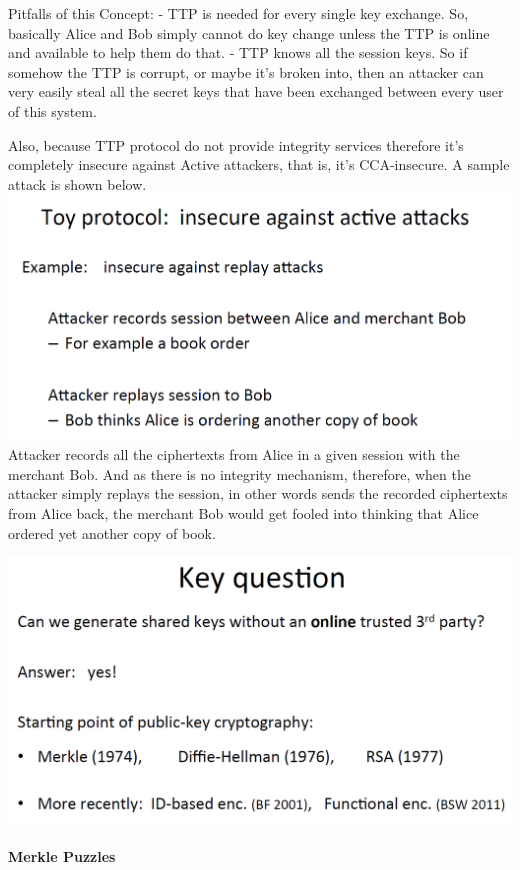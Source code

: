 \documentclass[11pt]{article}
\makeatletter
\def\maxwidth{\ifdim\Gin@nat@width>\linewidth\linewidth
    \else\Gin@nat@width\fi}
\let\Oldincludegraphics\includegraphics
\renewcommand{\includegraphics}[1]{\Oldincludegraphics[width=.8\maxwidth]{#1}}
\makeatother
\begin{document}
Pitfalls of this Concept: - TTP is needed for every single key exchange.
So, basically Alice and Bob simply cannot do key change unless the TTP
is online and available to help them do that. - TTP knows all the
session keys. So if somehow the TTP is corrupt, or maybe it's broken
into, then an attacker can very easily steal all the secret keys that
have been exchanged between every user of this system.

Also, because TTP protocol do not provide integrity services therefore
it's completely insecure against Active attackers, that is, it's
CCA-insecure. A sample attack is shown below.
\includegraphics{./Images/ToyProtocol-CCAInsecure.png} Attacker records
all the ciphertexts from Alice in a given session with the merchant Bob.
And as there is no integrity mechanism, therefore, when the attacker
simply replays the session, in other words sends the recorded
ciphertexts from Alice back, the merchant Bob would get fooled into
thinking that Alice ordered yet another copy of book.

\includegraphics{./Images/StartPoint-PublicKeyCrypto.png}

\hypertarget{merkle-puzzles}{%
\paragraph{Merkle Puzzles}\label{merkle-puzzles}}
\end{document}
